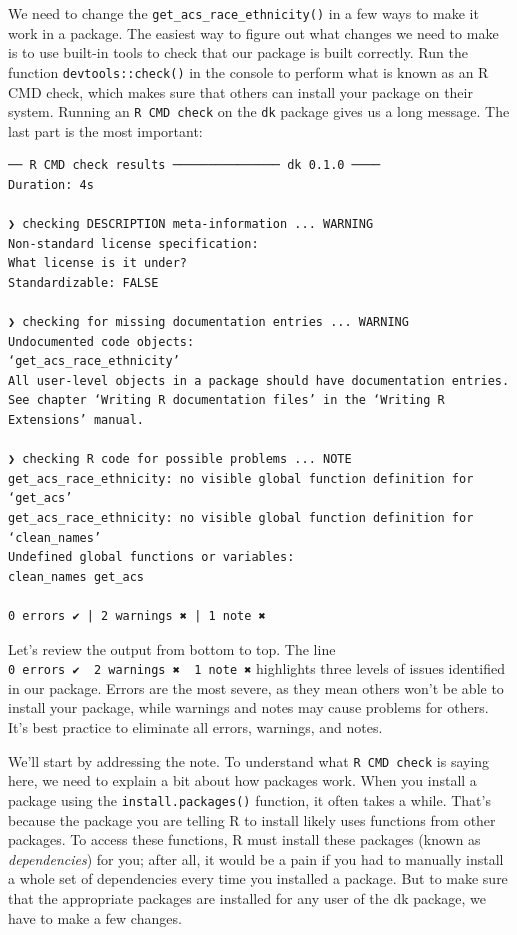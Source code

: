 \documentclass[
]{book}
\begin{document}
We need to change the \texttt{get\_acs\_race\_ethnicity()} in a few ways to make it work in a package. The easiest way to figure out what changes we need to make is to use built-in tools to check that our package is built correctly. Run the function \texttt{devtools::check()} in the console to perform what is known as an R CMD check, which makes sure that others can install your package on their system. Running an \texttt{R\ CMD\ check} on the \texttt{dk} package gives us a long message. The last part is the most important:

\begin{verbatim}
── R CMD check results ─────────────── dk 0.1.0 ────
Duration: 4s

❯ checking DESCRIPTION meta-information ... WARNING
Non-standard license specification:
What license is it under?
Standardizable: FALSE

❯ checking for missing documentation entries ... WARNING
Undocumented code objects:
‘get_acs_race_ethnicity’
All user-level objects in a package should have documentation entries.
See chapter ‘Writing R documentation files’ in the ‘Writing R
Extensions’ manual.

❯ checking R code for possible problems ... NOTE
get_acs_race_ethnicity: no visible global function definition for
‘get_acs’
get_acs_race_ethnicity: no visible global function definition for
‘clean_names’
Undefined global functions or variables:
clean_names get_acs

0 errors ✔ | 2 warnings ✖ | 1 note ✖
\end{verbatim}

Let's review the output from bottom to top. The line \texttt{0\ errors\ ✔\ \textbar{}\ 2\ warnings\ ✖\ \textbar{}\ 1\ note\ ✖} highlights three levels of issues identified in our package. Errors are the most severe, as they mean others won't be able to install your package, while warnings and notes may cause problems for others. It's best practice to eliminate all errors, warnings, and notes.

We'll start by addressing the note. To understand what \texttt{R\ CMD\ check} is saying here, we need to explain a bit about how packages work. When you install a package using the \texttt{install.packages()} function, it often takes a while. That's because the package you are telling R to install likely uses functions from other packages. To access these functions, R must install these packages (known as \emph{dependencies}) for you; after all, it would be a pain if you had to manually install a whole set of dependencies every time you installed a package. But to make sure that the appropriate packages are installed for any user of the dk package, we have to make a few changes.
\end{document}
